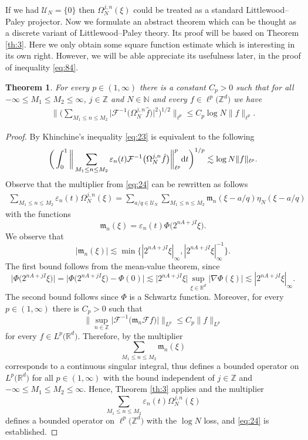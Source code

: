 \documentclass[a4paper,oneside]{amsart}
\theoremstyle{plain}
\newtheorem{theorem}{Theorem}
\theoremstyle{definition}
\numberwithin{equation}{section}
\newcounter{thm}
\theoremstyle{plain}
\newcommand{\RR}{\mathbb{R}}
\newcommand{\ZZ}{\mathbb{Z}}
\newcommand{\NN}{\mathbb{N}}
\newcommand{\calF}{\mathcal{F}}
\newcommand{\8}{\infty}
\begin{document}
If we had $\mathscr U_{N}=\{0\}$ then $\Omega_{N}^{j, n}(\xi)$ could
be treated as a standard Littlewood--Paley projector.  Now we
formulate an abstract  theorem which can be thought as a discrete
variant of Littlewood--Paley theory. Its proof will be based on
Theorem \ref{th:3}. Here we only obtain some square function estimate
which is interesting in its own right. However, we will be able appreciate its
usefulness later, in the proof of inequality \eqref{eq:84}.
\begin{theorem}
  \label{thm:30}
For every
$p\in(1, \infty)$ there is a
constant $C_p>0$ such that for all $-\infty\le M_1\le M_2\le \infty$,
$j\in\ZZ$ and $N\in\NN$ and every  $f\in\ell^p\big(\ZZ^d\big)$ we have
 \begin{align}
   \label{eq:23}
   \bigg\|\Big(\sum_{M_1\le n\le M_2}\big|\mathcal
  F^{-1}\big(\Omega_{N}^{j, n}\hat{f}\big)\big|^2\Big)^{1/2}\bigg\|_{\ell^p}\le C_p \log N\|f\|_{\ell^p}.
 \end{align}
\end{theorem}
\begin{proof}
  
By Khinchine's inequality \eqref{eq:23} is equivalent to the following
\begin{align}
  \label{eq:24}
  \bigg(\int_0^1\bigg\|\sum_{M_1\le n\le M_2}\varepsilon_n(t)\mathcal
  F^{-1}\big(\Omega_{N}^{j, n}\hat{f}\big)\bigg\|_{\ell^p}^p{\rm d}t\bigg)^{1/p}\lesssim \log N\|f\|_{\ell^p}.
\end{align}
Observe  that the multiplier from \eqref{eq:24} can be
rewritten as follows
\begin{align*}
 \sum_{M_1\le n\le M_2}\varepsilon_n(t) \Omega_N^{j, n}(\xi)=\sum_{a/q\in\mathscr
    U_{N}}\sum_{M_1\le n\le M_2}\mathfrak
  m_n(\xi-a/q)\eta_N(\xi-a/q)
\end{align*}
with the functions 
\[
\mathfrak m_n(\xi)=\varepsilon_n(t)\Phi\big(2^{nA+jI}\xi\big).
\]
We observe that
\[
|\mathfrak m_n(\xi)|\lesssim\min\big\{|2^{nA+jI}\xi|_{\infty}, |2^{nA+jI}\xi|_{\infty}^{-1}\big\}. 
\] 
The first bound follows from the mean-value theorem, since
\[
\big|\Phi\big(2^{nA+jI}\xi\big)\big|=
\big|\Phi\big(2^{nA+jI}\xi\big)-
\Phi(0)\big|\lesssim\big|2^{nA+jI}\xi\big|\sup_{\xi\in\RR^d}\big|\nabla
\Phi(\xi)\big| \lesssim |2^{nA+jI}\xi|_{\infty}.
\]
The second bound follows since $\Phi$ is a Schwartz
function. Moreover, for every $p\in(1, \infty)$ there is $C_p>0$ such
that 
\[
\big\|\sup_{n\in\ZZ}\big|\calF^{-1}\big(\mathfrak m_n\calF
f\big)\big|\big\|_{L^p}\le C_p \|f\|_{L^p}
\]
for every $f\in L^p\big(\RR^d\big)$. Therefore, by \cite{bigs} the
 multiplier  
\[
\sum_{M_1\le n\le M_2}\mathfrak m_n(\xi)
\]
corresponds to a continuous singular integral, thus
defines a bounded operator 
on $L^p\big(\RR^d\big)$ for all
$p\in(1, \infty)$ with the bound independent of $j\in\ZZ$ and $-\infty\le M_1\le
M_2\le \infty$. Hence, Theorem \ref{th:3} applies and  
the multiplier 
\[
\sum_{M_1\le n\le M_2}\varepsilon_n(t) \Omega_N^{j, n}(\xi)
\]
 defines a
bounded  operator on $\ell^p\big(\ZZ^d\big)$ with the $\log N$ loss, and \eqref{eq:24} is
established.
\end{proof}
\end{document}
